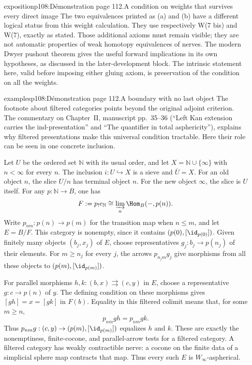 \begin{dcomment}{exposition}{p108:Démonstration page 112.}{A condition on weights that survives every direct image}
The two equivalences printed as (a) and (b) have a different logical status from this weight calculation. They use respectively W(7 bis) and W(7), exactly as stated. Those additional axioms must remain visible; they are not automatic properties of weak homotopy equivalences of nerves. The modern Dwyer pushout theorem gives the useful forward implications in its own hypotheses, as discussed in the later-development block. The intrinsic statement here, valid before imposing either gluing axiom, is preservation of the condition on all the weights.
\end{dcomment}

\begin{dcomment}{examples}{p108:Démonstration page 112.}{A boundary with no last object}
The footnote about filtered categories points beyond the original adjoint criterion. The commentary on Chapter~II, manuscript pp.~35--36 (``Left Kan extension carries the ind-presentation'' and ``The quantifier in total asphericity''), explains why filtered presentations make this universal condition tractable. Here their role can be seen in one concrete inclusion.

Let $U$ be the ordered set $\mathbb N$ with its usual order, and let $X=\mathbb N\cup\{\infty\}$ with $n<\infty$ for every $n$. The inclusion $i:U\hookrightarrow X$ is a sieve and $\overline U=X$. For an old object $n$, the slice $U/n$ has terminal object $n$. For the new object $\infty$, the slice is $U$ itself. For any $p:\mathbb N\to B$, one has
\[
 F:=p_!e_{\mathbb N}\cong\varinjlim_n\Hom_B(-,p(n)).
\]
Write $p_{nm}:p(n)\to p(m)$ for the transition map when $n\leq m$, and let $E=B/F$. This category is nonempty, since it contains $(p(0),[\id_{p(0)}])$. Given finitely many objects $(b_j,x_j)$ of $E$, choose representatives $g_j:b_j\to p(n_j)$ of their elements. For $m\geq n_j$ for every $j$, the arrows $p_{n_jm}g_j$ give morphisms from all these objects to $(p(m),[\id_{p(m)}])$.

For parallel morphisms $h,k:(b,x)\rightrightarrows(c,y)$ in $E$, choose a representative $g:c\to p(n)$ of $y$. The defining condition on these morphisms gives $[gh]=x=[gk]$ in $F(b)$. Equality in this filtered colimit means that, for some $m\geq n$,
\[
 p_{nm}gh=p_{nm}gk.
\]
Thus $p_{nm}g:(c,y)\to(p(m),[\id_{p(m)}])$ equalizes $h$ and $k$. These are exactly the nonemptiness, finite-cocone, and parallel-arrow tests for a filtered category. A filtered category has weakly contractible nerve: a cocone on the finite data of a simplicial sphere map contracts that map. Thus every such $E$ is $W_\infty$-aspherical.


\end{dcomment}
